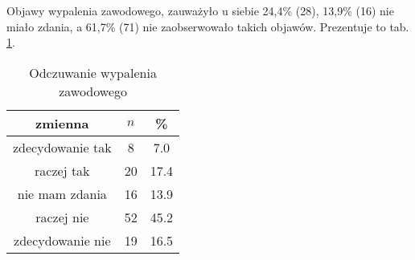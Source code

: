 Objawy wypalenia zawodowego, zauważyło u siebie 24,4\% (28), 13,9\% (16) nie miało zdania, a 61,7\% (71) nie zaobserwowało takich objawów. Prezentuje to tab. \ref{tab:Q35}.

\begin{table}[H]
\caption{Odczuwanie wypalenia zawodowego}
\centering
\begin{tabular}{ | c | c | c |}
\hline
zmienna & $n$ & \% \\
\hline
zdecydowanie tak  &  8  & 7.0 \\
\hline
raczej tak  &  20  & 17.4 \\
\hline
nie mam zdania  &  16  & 13.9 \\
\hline
raczej nie  &  52  & 45.2 \\
\hline
zdecydowanie nie  &  19  & 16.5\\
\hline
\end{tabular}
\label{tab:Q35}
\end{table}
